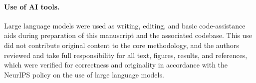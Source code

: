 \documentclass{article}
\begin{document}
\paragraph*{Use of AI tools.} Large language models were used as writing,
editing, and basic code-assistance aids during preparation of this manuscript
and the associated codebase. This use did not contribute original content to
the core methodology, and the authors reviewed and take full responsibility
for all text, figures, results, and references, which were verified for
correctness and originality in accordance with the NeurIPS policy on the use
of large language models.
\end{document}

